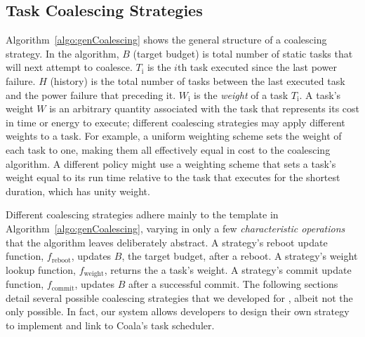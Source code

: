 \subsection{Task Coalescing Strategies}

Algorithm~\ref{algo:genCoalescing} shows the general structure of a coalescing strategy. In the algorithm, $B$ (target budget) is total number of static tasks that \sys will next attempt to coalesce. $T_\text{i}$ is the $i$th task
executed since the last power failure. $H$ (history) is the total number of
tasks between the last executed task and the power failure that preceding it.
$W_\text{i}$ is the {\em weight} of a task $T_\text{i}$.  A task's weight $W$ is an
arbitrary quantity associated with the task that represents its cost in time or
energy to execute; different coalescing strategies may apply different weights
to a task.  For example, a uniform weighting scheme sets the weight of each
task to one, making them all effectively equal in cost to the coalescing
algorithm.  A different policy might use a weighting scheme that sets a task's
weight equal to its run time relative to the task that executes for the
shortest duration, which has unity weight. 

Different coalescing strategies adhere mainly to the template in
Algorithm~\ref{algo:genCoalescing}, varying in only a few {\em characteristic
operations} that the algorithm leaves deliberately abstract.  A strategy's
reboot update function, $f_\text{reboot}$, updates $B$, the target budget,
after a reboot. A strategy's weight lookup function, $f_\text{weight}$, returns
the a task's weight.  A strategy's commit update function, $f_\text{commit}$,
updates $B$ after a successful commit. The following sections detail several
possible coalescing strategies that we developed for \sys, albeit not the only possible. In fact, our system allows developers to design their own strategy to implement and link to Coala’s task scheduler. 
% 
